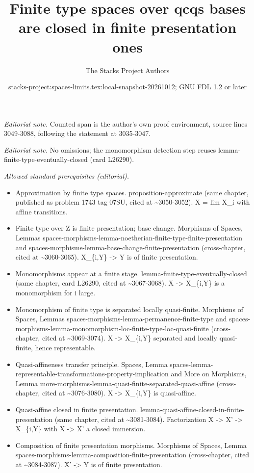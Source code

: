 \documentclass{stacks-project}
\title{Finite type spaces over qcqs bases are closed in finite presentation ones}
\author{The Stacks Project Authors}
\date{stacks-project:spaces-limits.tex:local-snapshot-20261012; GNU FDL 1.2 or later}
\theoremstyle{plain}
\theoremstyle{definition}
\theoremstyle{remark}
\numberwithin{equation}{subsection}
\begin{document}
\maketitle
\noindent\textit{Editorial note.} Counted span is the author's own proof environment, source lines 3049-3088, following the statement at 3035-3047.\par\medskip
\noindent\textit{Editorial note.} No omissions; the monomorphism detection step reuses lemma-finite-type-eventually-closed (card L26290).\par\medskip
\noindent\textit{Allowed standard prerequisites (editorial).}\begin{itemize}
\item Approximation by finite type spaces. proposition-approximate (same chapter, published as problem 1743 tag 07SU, cited at \textasciitilde{}3050-3052). X = lim X\_i with affine transitions.
\item Finite type over Z is finite presentation; base change. Morphisms of Spaces, Lemmas spaces-morphisms-lemma-noetherian-finite-type-finite-presentation and spaces-morphisms-lemma-base-change-finite-presentation (cross-chapter, cited at \textasciitilde{}3060-3065). X\_\{i,Y\} -> Y is of finite presentation.
\item Monomorphisms appear at a finite stage. lemma-finite-type-eventually-closed (same chapter, card L26290, cited at \textasciitilde{}3067-3068). X -> X\_\{i,Y\} is a monomorphism for i large.
\item Monomorphism of finite type is separated locally quasi-finite. Morphisms of Spaces, Lemmas spaces-morphisms-lemma-permanence-finite-type and spaces-morphisms-lemma-monomorphism-loc-finite-type-loc-quasi-finite (cross-chapter, cited at \textasciitilde{}3069-3074). X -> X\_\{i,Y\} separated and locally quasi-finite, hence representable.
\item Quasi-affineness transfer principle. Spaces, Lemma spaces-lemma-representable-transformations-property-implication and More on Morphisms, Lemma more-morphisms-lemma-quasi-finite-separated-quasi-affine (cross-chapter, cited at \textasciitilde{}3076-3080). X -> X\_\{i,Y\} is quasi-affine.
\item Quasi-affine closed in finite presentation. lemma-quasi-affine-closed-in-finite-presentation (same chapter, cited at \textasciitilde{}3081-3084). Factorization X -> X' -> X\_\{i,Y\} with X -> X' a closed immersion.
\item Composition of finite presentation morphisms. Morphisms of Spaces, Lemma spaces-morphisms-lemma-composition-finite-presentation (cross-chapter, cited at \textasciitilde{}3084-3087). X' -> Y is of finite presentation.
\end{itemize}\medskip
\end{document}
